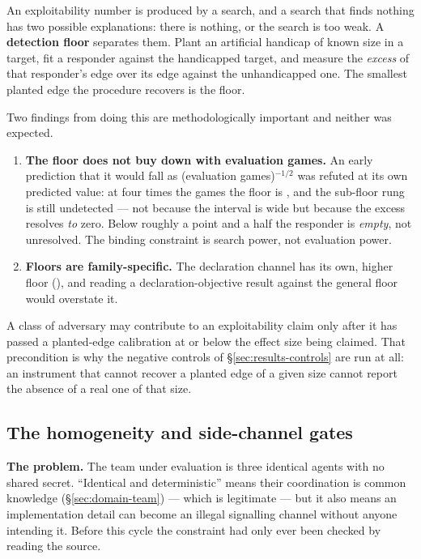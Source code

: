 An exploitability number is produced by a search, and a search that finds nothing has two possible
explanations: there is nothing, or the search is too weak. A \textbf{detection floor} separates
them. Plant an artificial handicap of known size in a target, fit a responder against the
handicapped target, and measure the \emph{excess} of that responder's edge over its edge against the
unhandicapped one. The smallest planted edge the procedure recovers is the floor.

Two findings from doing this are methodologically important and neither was expected.

\begin{enumerate}
\item \textbf{The floor does not buy down with evaluation games.} An early prediction that it would
      fall as (evaluation games)$^{-1/2}$ was refuted at its own predicted value: at four times the
      games the floor is \vsevenPrimaryFloor{}, and the sub-floor rung is still undetected --- not
      because the interval is wide but because the excess resolves \emph{to} zero. Below roughly a
      point and a half the responder is \emph{empty}, not unresolved. The binding constraint is
      search power, not evaluation power.
\item \textbf{Floors are family-specific.} The declaration channel has its own, higher floor
      (\vsevenDeclFloor{}), and reading a declaration-objective result against the general floor
      would overstate it.
\end{enumerate}

A class of adversary may contribute to an exploitability claim only after it has passed a
planted-edge calibration at or below the effect size being claimed. That precondition is why the
negative controls of \S\ref{sec:results-controls} are run at all: an instrument that cannot recover
a planted edge of a given size cannot report the absence of a real one of that size.

\subsection{The homogeneity and side-channel gates}
\label{sec:methodology-side}

\textbf{The problem.} The team under evaluation is three identical agents with no shared secret.
``Identical and deterministic'' means their coordination is common knowledge
(\S\ref{sec:domain-team}) --- which is legitimate --- but it also means an implementation detail can
become an illegal signalling channel without anyone intending it. Before this cycle the constraint
had only ever been checked by reading the source.

